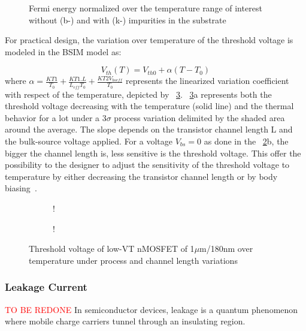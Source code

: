 \begin{figure}[!ht]
	\centering
	
	\caption{Fermi energy normalized over the temperature range of interest without (b-) and with (k-) impurities in the substrate}
	\label{fig:electron_fermi_si}
\end{figure}

For practical design, the variation over temperature of the threshold voltage is modeled in the BSIM model as:

\begin{equation}
V_{th}(T) = V_{th0} + \alpha (T - T_0)
\end{equation}
where \(\alpha = \frac{KT1}{T_0}+\frac{KT1.L}{L_{eff} T_0}+\frac{KT2 V_{bseff}}{T_0}\) represents the linearized variation coefficient with respect of the temperature, depicted by \figurename~\ref{fig:vth_nel}. \figurename~\ref{fig:vth_nel}a represents both the threshold voltage decreasing with the temperature (solid line) and the thermal behavior for a lot under a 3\(\sigma \) process variation delimited by the shaded area around the average. The slope depends on the transistor channel length L and the bulk-source voltage applied. For a voltage \(V_{bs} = 0 \) as done in the \figurename~\ref{fig:vth_nel_L}b, the bigger the channel length is, less sensitive is the threshold voltage. This offer the possibility to the designer to adjust the sensitivity of the threshold voltage to temperature by either decreasing the transistor channel length or by body biasing~\cite{Kumar2008}.

\begin{figure}[!ht]
	\centering
	\begin{subfigure}[b]{0.48\textwidth}
		\resizebox {\textwidth} {!} { 
			
		}
	\end{subfigure}
	\begin{subfigure}[b]{0.48\textwidth}
		\resizebox {\textwidth} {!} { 
			
		}
		\label{fig:vth_nel_L}
	\end{subfigure}
	\caption{Threshold voltage of low-VT nMOSFET of 1\(\mu \)m/180nm over temperature under process and channel length variations}
	\label{fig:vth_nel}
\end{figure}

\subsubsection{Leakage Current}        %
\textcolor{red}{TO BE REDONE}
In semiconductor devices, leakage is a quantum phenomenon where mobile charge carriers tunnel through an insulating region.

